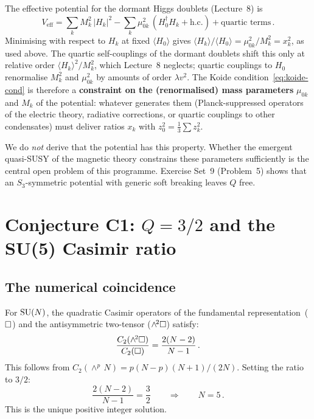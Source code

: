 \documentclass[11pt,a4paper]{article}
\begin{document}
The effective potential for the dormant Higgs doublets
(Lecture~8) is
\begin{equation}
  V_{\text{eff}} = \sum_k M_k^2\,|H_k|^2
  - \sum_k \mu_{0k}^2\,(H_0^\dagger H_k + \text{h.c.})
  + \text{quartic terms}\,.
  \label{eq:Veff}
\end{equation}
Minimising with respect to $H_k$ at fixed $\langle H_0\rangle$ gives
$\langle H_k\rangle/\langle H_0\rangle = \mu_{0k}^2/M_k^2 = x_k^2$,
as used above.  The quartic self-couplings of the dormant doublets
shift this only at relative order $\langle H_k\rangle^2/M_k^2$, which
Lecture~8 neglects; quartic couplings to $H_0$ renormalise $M_k^2$
and $\mu_{0k}^2$ by amounts of order $\lambda v^2$.  The Koide
condition~\eqref{eq:koide-cond} is therefore a \textbf{constraint on
the (renormalised) mass parameters} $\mu_{0k}$ and $M_k$ of the
potential: whatever generates them
(Planck-suppressed operators of the electric theory, radiative
corrections, or quartic couplings to other condensates) must deliver
ratios $x_k$ with $z_0^2 = \frac{1}{3}\sum z_k^2$.

We do \emph{not} derive that the potential has this property.
Whether the emergent quasi-SUSY of the magnetic theory constrains
these parameters sufficiently is the central open problem of this
programme.  Exercise Set~9 (Problem~5) shows that an $S_3$-symmetric
potential with generic soft breaking leaves $Q$ free.

\section{Conjecture C1: \texorpdfstring{$Q = 3/2$}{Q = 3/2} and the SU(5) Casimir ratio}
\label{sec:casimir}

\subsection{The numerical coincidence}

For $\mathrm{SU}(N)$, the quadratic Casimir operators of the fundamental
representation~($\square$) and the antisymmetric two-tensor
($\wedge^{\!2}\square$) satisfy:
\begin{equation}
  \frac{C_2(\wedge^{\!2}\square)}{C_2(\square)}
  = \frac{2(N-2)}{N-1}\,.
  \label{eq:casimir-ratio}
\end{equation}
This follows from $C_2(\wedge^p\,N) = p(N-p)(N+1)/(2N)$.
Setting the ratio to $3/2$:
\begin{equation}
  \frac{2(N-2)}{N-1} = \frac{3}{2}
  \qquad\Longrightarrow\qquad N = 5\,.
  \label{eq:Q-N5}
\end{equation}
This is the unique positive integer solution.
\end{document}
